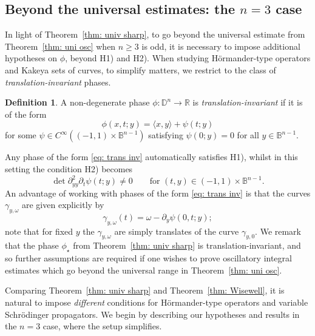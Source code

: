 \documentclass[reqno]{amsart}
\numberwithin{equation}{section}
\newcommand{\B}{\mathbb{B}}
\newcommand{\D}{\mathbb{D}}
\newcommand{\R}{\mathbb{R}}
\def\inn#1#2{\langle#1,#2\rangle}
\theoremstyle{plain}
\theoremstyle{definition}
\newtheorem{definition}[theorem]{Definition}
\begin{document}


\subsection{Beyond the universal estimates: the $n=3$ case}\label{240511subsection2_1}
In light of Theorem~\ref{thm: univ sharp}, to go beyond the universal estimate from Theorem~\ref{thm: uni osc} when $n \geq 3$ is odd, it is necessary to impose additional hypotheses on $\phi$, beyond H1) and H2). When studying H\"ormander-type operators and Kakeya sets of curves, to simplify matters, we  restrict to the class of \textit{translation-invariant} phases.

\begin{definition} A non-degenerate phase $\phi \colon \D^n \to \R$ is \textit{translation-invariant} if it is of the form 
\begin{equation}\label{eq: trans inv}
    \phi(x,t;y) = \inn{x}{y} + \psi(t;y)
\end{equation}
for some $\psi \in C^{\infty}((-1,1) \times \B^{n-1})$ satisfying $\psi(0; y) = 0$ for all $y \in \B^{n-1}$. 
\end{definition}

Any phase of the form \eqref{eq: trans inv} automatically satisfies H1), whilst in this setting the condition H2) becomes 
\begin{equation*}
    \det \partial_{yy}^2 \partial_t\psi(t;y) \neq 0 \qquad \textrm{for $(t,y) \in (-1,1) \times \B^{n-1}$.}
\end{equation*}
An advantage of working with phases of the form \eqref{eq: trans inv} is that the curves $\gamma_{y,\omega}$ are given explicitly by
\begin{equation*}
    \gamma_{y,\omega}(t) = \omega - \partial_y \psi(0, t; y);
\end{equation*}
note that for fixed $y$ the $\gamma_{y,\omega}$ are simply translates of the curve $\gamma_{y,0}$. We remark that the phase $\phi_{\star}$ from Theorem~\ref{thm: univ sharp} is translation-invariant, and so further assumptions are required if one wishes to prove oscillatory integral estimates which go beyond the universal range in Theorem~\ref{thm: uni osc}. 


Comparing Theorem~\ref{thm: univ sharp} and Theorem~\ref{thm: Wisewell}, it is natural to impose \textit{different} conditions for H\"ormander-type operators and variable Schr\"odinger propagators. We begin by describing our hypotheses and results in the $n = 3$ case, where the setup simplifies. 
\end{document}
